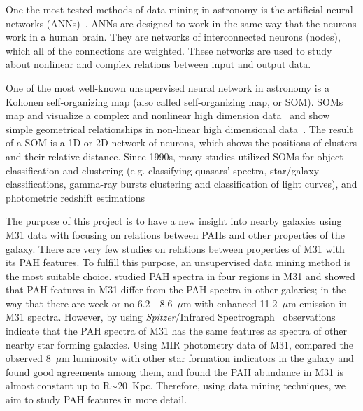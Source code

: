 One the most tested methods of data mining in astronomy is the artificial neural networks (ANNs)~\citep[e.g.][and references therein]{ Hossein14,Hossein16}.
ANNs are designed to work in the same way that the neurons work in a human brain.
They are networks of interconnected neurons (nodes), which all of the connections are weighted.
These networks are used to study about nonlinear and complex relations between input and output data.

One of the most well-known unsupervised neural network in astronomy is a Kohonen self-organizing map (also called self-organizing map, or SOM).
SOMs map and visualize a complex and nonlinear high dimension data~\citep{Kohonen82} and show simple geometrical relationships in non-linear high dimensional data~\citep{Kohonen98}.
The result of a SOM is a 1D or 2D network of neurons, which shows the positions of clusters and their relative distance.
Since 1990s, many studies utilized SOMs for object classification and clustering (e.g. classifying quasars' spectra, star/galaxy classifications, gamma-ray bursts clustering and classification of light curves), and photometric redshift estimations~\citep[e.g.][]{Odewahn92, Hernandez94, Murtagh95, Maehoenen95,Scaringi09,Geach12,Fustes13,Meusinger16,Rahmani16b} %

The purpose of this project is to have a new insight into nearby galaxies using M31 data with focusing on relations between PAHs and other properties of the galaxy.
There are very few studies on relations between properties of M31 with its PAH features.
To fulfill this purpose, an unsupervised data mining method is the most suitable choice.
\cite{Cesarsky98} studied PAH spectra in four regions in M31 and showed that PAH features in M31 differ from the PAH spectra in other galaxies; in the way that there are  week or no 6.2 - 8.6~$\mu$m with enhanced 11.2~$\mu$m emission in M31 spectra. 
However, \cite{Dim15} by using {\it Spitzer}/Infrared Spectrograph~\citep[IRS,][]{Houck04b} observations indicate that the PAH spectra of M31 has the same features as spectra of other nearby star forming galaxies.
Using MIR photometry data of M31,\cite{Barmby06} compared the observed 8~$\mu$m luminosity with other star formation indicators in the galaxy and found good agreements among them, and \cite{Draine14} found the PAH abundance in M31 is almost constant up to R$\sim 20$~Kpc.
Therefore, using data mining techniques, we aim to study PAH features in more detail.

